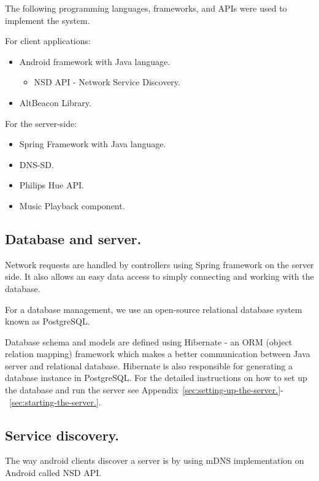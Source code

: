 The following programming languages, frameworks, and APIs were used to implement the system.

For client applications:
\begin{itemize}
    \item Android framework with Java language.
    \begin{itemize}
        \item NSD API - Network Service Discovery.
    \end{itemize}
    \item AltBeacon Library.
\end{itemize}

For the server-side:
\begin{itemize}
    \item Spring Framework with Java language.
    \item DNS-SD\@.
    \item Philips Hue API\@.
    \item Music Playback component.
\end{itemize}

\subsection{Database and server.}
\label{subsec:database-and-server}
Network requests are handled by controllers using Spring framework on the server side.
It also allows an easy data access to simply connecting and working with the database.

For a database management, we use an open-source relational database system known as PostgreSQL\@.

Database schema and models are defined using Hibernate - an ORM (object relation mapping) framework
which makes a better communication between Java server and relational database.
Hibernate is also responsible for generating a database instance in PostgreSQL\@.
For the detailed instructions on how to set up the database and run the server
see Appendix~\ref{sec:setting-up-the-server.}-~\ref{sec:starting-the-server.}.

\subsection{Service discovery.}
\label{subsec:service-discovery.}
The way android clients discover a server is by using mDNS implementation on Android called NSD API.

